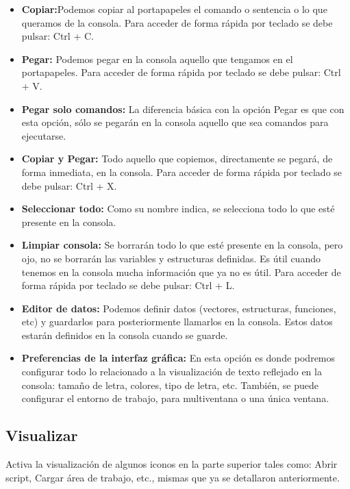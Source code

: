 \documentclass[11pt,a4paper,oneside]{book}\usepackage[]{graphicx}\usepackage[]{color}
\begin{document}
\begin{itemize}
\begin{itemize}
      \item {\bf Copiar:}Podemos copiar al portapapeles el comando o sentencia o lo que queramos de la consola. Para acceder de forma
      rápida por teclado se debe pulsar: Ctrl + C.
      \item {\bf Pegar:} Podemos pegar en la consola aquello que tengamos en el portapapeles. Para acceder de forma rápida por teclado
      se debe pulsar: Ctrl + V.
      \item {\bf Pegar solo comandos:} La diferencia básica con la opción Pegar es que con esta opción, sólo se pegarán en la consola
      aquello que sea comandos para ejecutarse.
      \item {\bf Copiar y Pegar:} Todo aquello que copiemos, directamente se pegará, de forma inmediata, en la consola. Para acceder de
      forma rápida por teclado se debe pulsar: Ctrl + X.
      \item {\bf Seleccionar todo:} Como su nombre indica, se selecciona todo lo que esté presente en la consola.
      \item {\bf Limpiar consola:} Se borrarán todo lo que esté presente en la consola, pero ojo, no se borrarán las variables y estructuras definidas. Es útil cuando tenemos en la consola mucha información que ya no es útil. Para acceder de forma rápida por
      teclado se debe pulsar: Ctrl + L.
      \item {\bf Editor de datos:} Podemos definir datos (vectores, estructuras, funciones, etc) y guardarlos para posteriormente llamarlos en la consola. Estos datos estarán definidos en la consola cuando se guarde.
      \item {\bf Preferencias de la interfaz gráfica:} En esta opción es donde podremos configurar todo lo relacionado a la visualización de texto reflejado en la consola: tamaño de letra, colores, tipo de letra, etc. También, se puede configurar el entorno de trabajo, para multiventana o una única ventana.
\end{itemize}

\subsection{Visualizar} 

Activa la visualización de algunos iconos en la parte superior tales como: Abrir script, Cargar área de trabajo, etc., mismas que ya se detallaron anteriormente.


\end{itemize}
\end{document}

